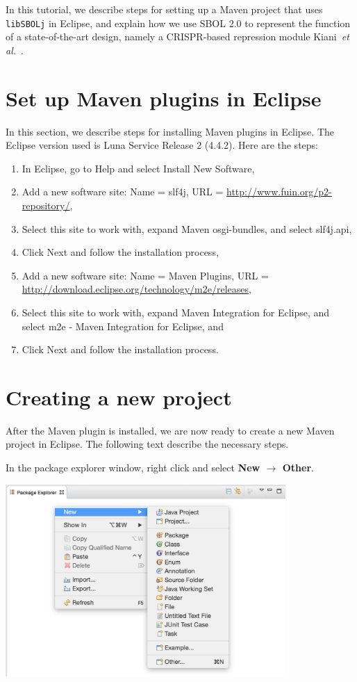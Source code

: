 \noindent In this tutorial, we describe steps for setting up a Maven
project that uses {\tt libSBOLj} in Eclipse, and explain how we use SBOL
2.0 to represent the function of a state-of-the-art design, namely a
CRISPR-based repression module Kiani~\textit{et
  al.}~\cite{kiani2014crispr}. 

\section*{Set up Maven plugins in Eclipse}
In this section, we describe steps for installing Maven plugins in Eclipse. The Eclipse version used is Luna Service Release 2 (4.4.2). Here are the steps:
\begin{enumerate}
\item In Eclipse, go to Help and select Install New Software, 
\item Add a new software site: Name = slf4j, URL = \url{http://www.fuin.org/p2-repository/}, 
\item Select this site to work with, expand Maven osgi-bundles, and select slf4j.api, 
\item Click Next and follow the installation process, 
\item Add a new software site: Name = Maven Plugins, URL = \url{http://download.eclipse.org/technology/m2e/releases}, 
\item Select this site to work with, expand Maven Integration for Eclipse, and select m2e - Maven Integration for Eclipse, and
\item Click Next and follow the installation process.
\end{enumerate}

\section*{Creating a new project}
After the Maven plugin is installed, we are now ready to create a new Maven project in Eclipse. The following text describe the necessary steps. 

In the package explorer window, right click and select {\bf New $\rightarrow$ Other}.
\begin{center}
  \includegraphics[width=0.8\textwidth]{figures/createNewMavenProject1}
\end{center}

